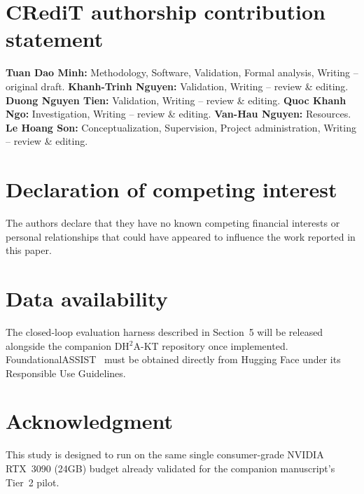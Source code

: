 \documentclass[review,12pt]{elsarticle}
\begin{document}
\section*{CRediT authorship contribution statement}
\textbf{Tuan Dao Minh:} Methodology, Software, Validation, Formal
analysis, Writing -- original draft.
\textbf{Khanh-Trinh Nguyen:} Validation, Writing -- review \& editing.
\textbf{Duong Nguyen Tien:} Validation, Writing -- review \& editing.
\textbf{Quoc Khanh Ngo:} Investigation, Writing -- review \& editing.
\textbf{Van-Hau Nguyen:} Resources.
\textbf{Le Hoang Son:} Conceptualization, Supervision, Project
administration, Writing -- review \& editing.

\section*{Declaration of competing interest}
The authors declare that they have no known competing financial
interests or personal relationships that could have appeared to
influence the work reported in this paper.

\section*{Data availability}
The closed-loop evaluation harness described in Section~5 will be
released alongside the companion DH$^2$A-KT repository once implemented.
FoundationalASSIST~\cite{foundationalassist2026} must be obtained
directly from Hugging Face under its Responsible Use Guidelines.

\section*{Acknowledgment}
This study is designed to run on the same single consumer-grade
NVIDIA RTX~3090 (24GB) budget already validated for the companion
manuscript's Tier~2 pilot.



\end{document}
